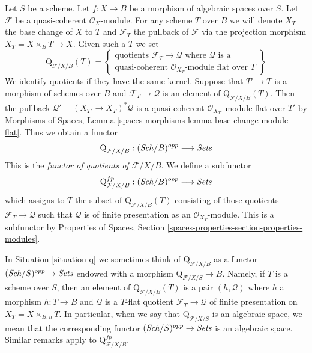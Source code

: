 \begin{situation}
\label{situation-q}
Let $S$ be a scheme. Let $f : X \to B$ be a morphism of algebraic spaces
over $S$. Let $\mathcal{F}$ be a quasi-coherent $\mathcal{O}_X$-module.
For any scheme $T$ over $B$ we will denote $X_T$ the base change of
$X$ to $T$ and $\mathcal{F}_T$ the pullback
of $\mathcal{F}$ via the projection morphism $X_T = X \times_B T \to X$.
Given such a $T$ we set
$$
\text{Q}_{\mathcal{F}/X/B}(T) =
\left\{
\begin{matrix}
\text{quotients }\mathcal{F}_T \to \mathcal{Q}\text{ where }
\mathcal{Q}\text{ is a}\\
\text{quasi-coherent }
\mathcal{O}_{X_T}\text{-module flat over }T
\end{matrix}
\right\}
$$
We identify quotients if they have the same kernel. Suppose
that $T' \to T$ is a morphism of schemes over $B$ and
$\mathcal{F}_T \to \mathcal{Q}$ is an element of
$\text{Q}_{\mathcal{F}/X/B}(T)$. Then the pullback
$\mathcal{Q}' = (X_{T'} \to X_T)^*\mathcal{Q}$ is a quasi-coherent
$\mathcal{O}_{X_{T'}}$-module flat over $T'$ by
Morphisms of Spaces, Lemma
\ref{spaces-morphisms-lemma-base-change-module-flat}.
Thus we obtain a functor
\begin{equation}
\label{equation-q}
\text{Q}_{\mathcal{F}/X/B} : (\mathit{Sch}/B)^{opp} \longrightarrow \textit{Sets}
\end{equation}
This is the {\it functor of quotients of $\mathcal{F}/X/B$}.
We define a subfunctor
\begin{equation}
\label{equation-q-fp}
\text{Q}^{fp}_{\mathcal{F}/X/B} : (\mathit{Sch}/B)^{opp} \longrightarrow \textit{Sets}
\end{equation}
which assigns to $T$ the subset of $\text{Q}_{\mathcal{F}/X/B}(T)$
consisting of those quotients $\mathcal{F}_T \to \mathcal{Q}$
such that $\mathcal{Q}$ is of finite presentation as an
$\mathcal{O}_{X_T}$-module. This is a subfunctor by
Properties of Spaces, Section
\ref{spaces-properties-section-properties-modules}.
\end{situation}

\noindent
In Situation \ref{situation-q} we sometimes think of
$\text{Q}_{\mathcal{F}/X/B}$ as a functor
$(\mathit{Sch}/S)^{opp} \to \textit{Sets}$ endowed
with a morphism $\text{Q}_{\mathcal{F}/X/S} \to B$.
Namely, if $T$ is a scheme over $S$, then an element
of $\text{Q}_{\mathcal{F}/X/B}(T)$ is a pair $(h, \mathcal{Q})$
where $h$ a morphism $h : T \to B$
and $\mathcal{Q}$ is a $T$-flat quotient $\mathcal{F}_T \to \mathcal{Q}$
of finite presentation on $X_T = X \times_{B, h} T$. In particular, when we say
that $\text{Q}_{\mathcal{F}/X/S}$ is an algebraic space, we mean that the
corresponding functor $(\mathit{Sch}/S)^{opp} \to \textit{Sets}$ is an algebraic space.
Similar remarks apply to $\text{Q}^{fp}_{\mathcal{F}/X/B}$.

